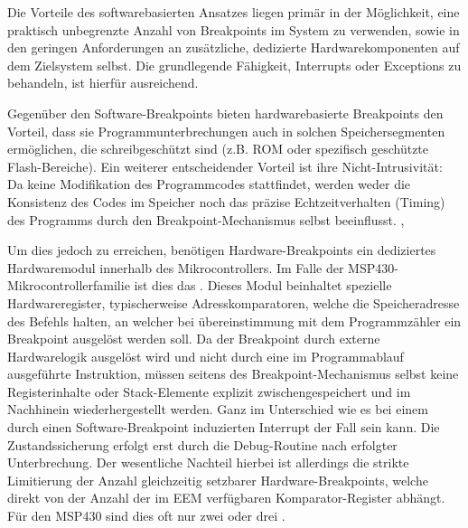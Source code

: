 Die Vorteile des softwarebasierten Ansatzes liegen prim\"ar in der M\"oglichkeit, eine praktisch unbegrenzte Anzahl von Breakpoints im System zu verwenden, sowie in den geringen Anforderungen an zus\"atzliche, dedizierte Hardwarekomponenten auf dem Zielsystem selbst. Die grundlegende F\"ahigkeit, Interrupts oder Exceptions zu behandeln, ist hierf\"ur ausreichend. 

Gegen\"uber den Software-Breakpoints bieten hardwarebasierte Breakpoints den Vorteil, dass sie Programmunterbrechungen auch in solchen Speichersegmenten erm\"oglichen, die schreibgesch\"utzt sind (z.B. ROM oder spezifisch gesch\"utzte Flash-Bereiche). Ein weiterer entscheidender Vorteil ist ihre Nicht-Intrusivit\"at: Da keine Modifikation des Programmcodes stattfindet, werden weder die Konsistenz des Codes im Speicher noch das pr\"azise Echtzeitverhalten (Timing) des Programms durch den Breakpoint-Mechanismus selbst beeinflusst. , 

Um dies jedoch zu erreichen, ben\"otigen Hardware-Breakpoints ein dediziertes Hardwaremodul innerhalb des Mikrocontrollers. Im Falle der MSP430-Mikrocontrollerfamilie ist dies das  . Dieses Modul beinhaltet spezielle Hardwareregister, typischerweise Adresskomparatoren, welche die Speicheradresse des Befehls halten, an welcher bei \"ubereinstimmung mit dem Programmz\"ahler ein Breakpoint ausgel\"ost werden soll. Da der Breakpoint durch externe Hardwarelogik ausgel\"ost wird und nicht durch eine im Programmablauf ausgef\"uhrte Instruktion, m\"ussen seitens des Breakpoint-Mechanismus selbst keine Registerinhalte oder Stack-Elemente explizit zwischengespeichert und im Nachhinein wiederhergestellt werden. Ganz im Unterschied wie es bei einem durch einen Software-Breakpoint induzierten Interrupt der Fall sein kann. Die Zustandssicherung erfolgt erst durch die Debug-Routine nach erfolgter Unterbrechung. Der wesentliche Nachteil hierbei ist allerdings die strikte Limitierung der Anzahl gleichzeitig setzbarer Hardware-Breakpoints, welche direkt von der Anzahl der im EEM verf\"ugbaren Komparator-Register abh\"angt. F\"ur den MSP430 sind dies oft nur zwei oder drei .

